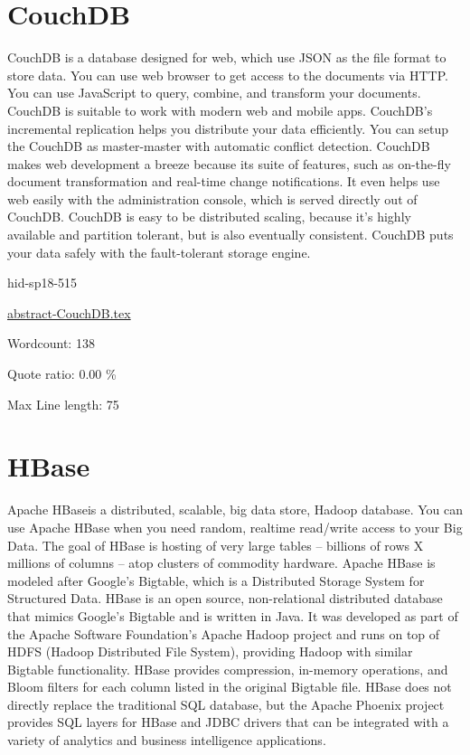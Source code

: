 \section{CouchDB}

CouchDB\cite{hid-sp18-515-www-couchdb} is a database designed for web, 
which use JSON as the file format to store data. You can use web 
browser to get access to the documents via HTTP. You can use JavaScript 
to query, combine, and transform your documents. CouchDB is suitable 
to work with modern web and mobile apps. CouchDB's incremental replication 
helps you distribute your data efficiently. You can setup the CouchDB 
as master-master with automatic conflict detection. CouchDB makes 
web development a breeze because its suite of features, such as 
on-the-fly document transformation and real-time change notifications. 
It even helps use web easily with the administration console, which 
is served directly out of CouchDB. CouchDB is easy to be distributed 
scaling, because it's highly available and partition tolerant, but 
is also eventually consistent. CouchDB puts your data safely with 
the fault-tolerant storage engine.



\begin{IU}

hid-sp18-515

\href{https://github.com/cloudmesh-community/hid-sp18-515/blob/master//technology/abstract-CouchDB.tex}{abstract-CouchDB.tex}

 

Wordcount: 138


Quote ratio: 0.00 \%
 
Max Line length: 75
\end{IU}

\section{HBase}

Apache HBase\cite{hid-sp18-515-www-hbase}is a distributed, scalable, 
big data store, Hadoop database. 
You can use Apache HBase when you need random, realtime read/write 
access to your Big Data.
The goal of HBase is hosting of very large tables -- billions of rows 
X millions of columns -- atop clusters of commodity hardware.
Apache HBase is modeled after Google's Bigtable, which is a Distributed 
Storage System for Structured Data.
HBase is an open source, non-relational distributed database that 
mimics Google's Bigtable and is written in Java. It was developed as
part of the Apache Software Foundation's Apache Hadoop project and 
runs on top of HDFS (Hadoop Distributed File System), providing 
Hadoop with similar Bigtable functionality. 
HBase provides compression, in-memory operations, and Bloom filters 
for each column listed in the original Bigtable file.
HBase does not directly replace the traditional SQL database, but 
the Apache Phoenix project provides SQL layers for HBase and JDBC 
drivers that can be integrated with a variety of analytics and 
business intelligence applications.


